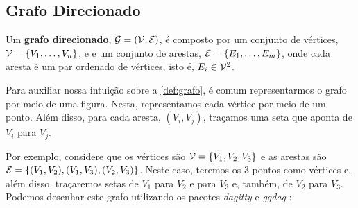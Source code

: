 \subsection{Grafo Direcionado}

\begin{definition}
 \label{def:grafo}
 Um \textbf{grafo direcionado}, 
 ${\mathcal G} = ({\mathcal V}, {\mathcal E})$,
 é composto por um conjunto de vértices,
 ${\mathcal V} = \{V_1, \ldots, V_n\}$, e
 e um conjunto de arestas,
 ${\mathcal E} = \{E_1, \ldots, E_m\}$, onde
 cada aresta é um par ordenado de vértices, isto é,
 $E_i \in {\mathcal V}^2$.
\end{definition}

Para auxiliar nossa intuição sobre a
\cref{def:grafo}, é comum representarmos
o grafo por meio de uma figura.
Nesta, representamos cada vértice por meio de um ponto.
Além disso, para cada aresta, $(V_i, V_j)$,
traçamos uma seta que aponta de $V_i$ para $V_j$.

Por exemplo, considere que os vértices são
${\mathcal V} = \{V_1, V_2, V_3\}$ e as arestas são
${\mathcal E} = \{(V_1, V_2), (V_1, V_3), (V_2, V_3)\}$.
Neste caso, teremos os $3$ pontos como vértices e,
além disso, traçaremos setas de $V_1$ para $V_2$ e para $V_3$ e,
também, de $V_2$ para $V_3$.
Podemos desenhar este grafo utilizando os
pacotes \textit{dagitty} e \textit{ggdag}
\citep{Barrett2022,Textor2016}:

